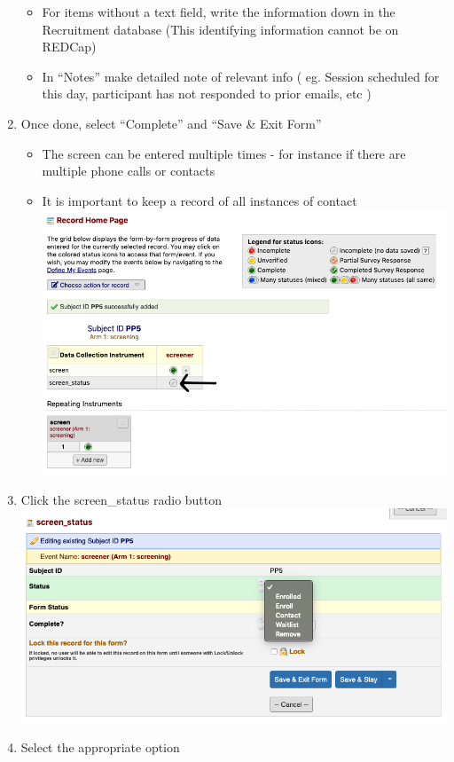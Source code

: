 \documentclass[]{book}
\providecommand{\tightlist}{%
  \setlength{\itemsep}{0pt}\setlength{\parskip}{0pt}}
\begin{document}
\begin{enumerate}
  \begin{itemize}
  \tightlist
  \item
    For items without a text field, write the information down in the Recruitment database (This identifying information cannot be on REDCap)
  \item
    In ``Notes'' make detailed note of relevant info ( eg. Session scheduled for this day, participant has not responded to prior emails, etc )
  \end{itemize}
\item
  Once done, select ``Complete'' and ``Save \& Exit Form''

  \begin{itemize}
  \tightlist
  \item
    The screen can be entered multiple times - for instance if there are multiple phone calls or contacts
  \item
    It is important to keep a record of all instances of contact
    \includegraphics{images/redcap_screening/5.png}
  \end{itemize}
\item
  Click the screen\_status radio button
  \includegraphics{images/redcap_screening/6.png}
\item
  Select the appropriate option


\end{enumerate}
\end{document}
